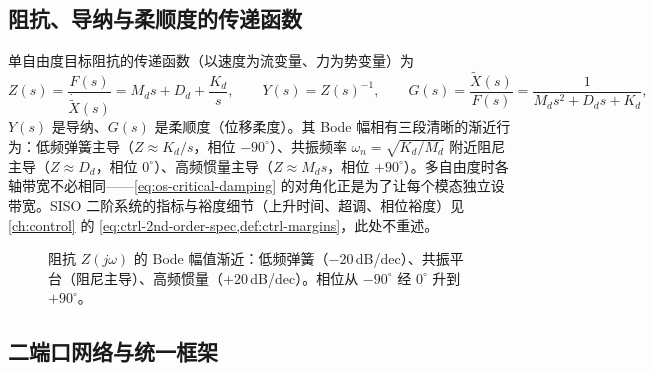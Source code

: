 \subsection{阻抗、导纳与柔顺度的传递函数}
\label{sec:os-transfer}

单自由度目标阻抗的传递函数（以速度为流变量、力为势变量）为
\begin{equation}
  Z(s)=\frac{F(s)}{\dot{\tilde X}(s)}=M_d s+D_d+\frac{K_d}{s},\qquad
  Y(s)=Z(s)^{-1},\qquad
  G(s)=\frac{\tilde X(s)}{F(s)}=\frac{1}{M_d s^2+D_d s+K_d},
  \label{eq:os-Zs}
\end{equation}
$Y(s)$ 是导纳、$G(s)$ 是柔顺度（位移柔度）。其 Bode 幅相有三段清晰的渐近行为：低频弹簧主导（$Z\approx K_d/s$，相位 $-90^\circ$）、共振频率 $\omega_n=\sqrt{K_d/M_d}$ 附近阻尼主导（$Z\approx D_d$，相位 $0^\circ$）、高频惯量主导（$Z\approx M_d s$，相位 $+90^\circ$）。多自由度时各轴带宽不必相同——\cref{eq:os-critical-damping} 的对角化正是为了让每个模态独立设带宽。SISO 二阶系统的指标与裕度细节（上升时间、超调、相位裕度）见 \cref{ch:control} 的 \cref{eq:ctrl-2nd-order-spec,def:ctrl-margins}，此处不重述。

\begin{figure}[ht]
\centering
{}
\caption{阻抗 $Z(j\omega)$ 的 Bode 幅值渐近：低频弹簧（$-20\,$dB/dec）、共振平台（阻尼主导）、高频惯量（$+20\,$dB/dec）。相位从 $-90^\circ$ 经 $0^\circ$ 升到 $+90^\circ$。}
\label{fig:os-bode}
\end{figure}

\subsection{二端口网络与统一框架}
\label{sec:os-twoport}

